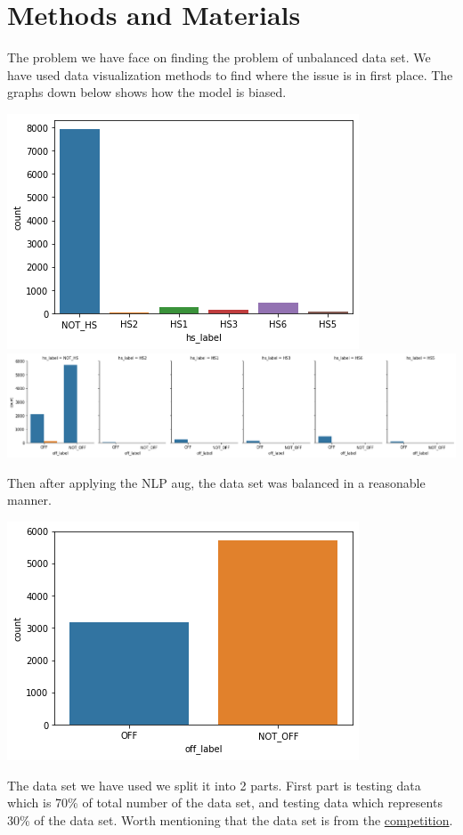 \documentclass{IEEEtran}
\begin{document}
\section{Methods and Materials}
The problem we have face on finding the problem of unbalanced data set. We have used data visualization methods to find where the issue is in first place. The graphs down below shows how the model is biased.

\includegraphics[width=\columnwidth, height=0.14\paperheight]{02.png}
\includegraphics[width=\columnwidth, height=0.14\paperheight, scale=1.4]{03.png}

Then after applying the NLP aug, the data set was balanced in a reasonable manner.

\includegraphics[width=\columnwidth, height=0.2\paperheight]{01.png}

The data set we have used we split it into 2 parts. First part is testing data which is 70\% of total number of the data set, and testing data which represents 30\% of the data set. Worth mentioning that the data set is from the \href{https://sites.google.com/view/arabichate2022/home}{competition}.
\end{document}
